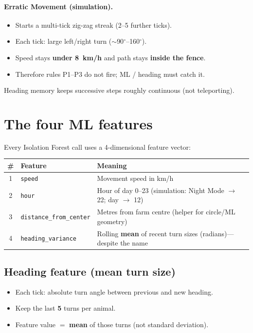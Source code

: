 \documentclass[11pt,a4paper]{article}
\begin{document}
\paragraph{Erratic Movement (simulation).}
\begin{itemize}[leftmargin=*]
  \item Starts a multi-tick zig-zag streak (2--5 further ticks).
  \item Each tick: large left/right turn ($\sim$90$^\circ$--160$^\circ$).
  \item Speed stays \textbf{under 8~km/h} and path stays \textbf{inside the fence}.
  \item Therefore rules P1--P3 do not fire; ML / heading must catch it.
\end{itemize}

Heading memory keeps successive steps roughly continuous (not teleporting).

\section{The four ML features}

Every Isolation Forest call uses a 4-dimensional feature vector:

\begin{center}
\begin{tabular}{@{}clp{8cm}@{}}
\toprule
\# & \textbf{Feature} & \textbf{Meaning} \\
\midrule
1 & \texttt{speed} & Movement speed in km/h \\
2 & \texttt{hour} & Hour of day 0--23
  (simulation: Night Mode $\rightarrow$ 22; day $\rightarrow$ 12) \\
3 & \texttt{distance\_from\_center} & Metres from farm centre
  (helper for circle/ML geometry) \\
4 & \texttt{heading\_variance} & Rolling \textbf{mean} of recent turn sizes
  (radians)---despite the name \\
\bottomrule
\end{tabular}
\end{center}

\subsection{Heading feature (mean turn size)}
\begin{itemize}[leftmargin=*]
  \item Each tick: absolute turn angle between previous and new heading.
  \item Keep the last \textbf{5} turns per animal.
  \item Feature value $=$ \textbf{mean} of those turns (not standard deviation).
\end{itemize}
\end{document}
